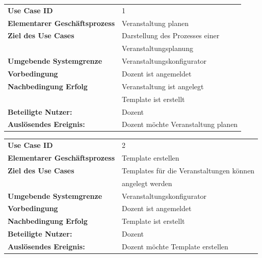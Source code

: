 	\begin{table}[H]
	\begin{tabular}{ll}
	 \textbf{Use Case ID} & 1 \\
 	 \textbf{Elementarer Geschäftsprozess} &  Veranstaltung planen \\ 
	 \textbf{Ziel des Use Cases} & Darstellung des  Prozesses einer    \\
	 & Veranstaltungsplanung\\ 
	 \textbf{Umgebende Systemgrenze}& Veranstaltungskonfigurator \\ 
	 \textbf{Vorbedingung} & Dozent ist angemeldet \\ 
	 \textbf{Nachbedingung Erfolg} & Veranstaltung ist angelegt \\ 
	 & Template ist erstellt\\
	 \textbf{Beteiligte Nutzer:} & Dozent \\ 
     \textbf{Auslösendes Ereignis:} & Dozent möchte Veranstaltung planen \\ 
	 
	\end{tabular} 
	\label{tab:usecase_1}
	\end{table}
	
		\begin{table}[H]
		\begin{tabular}{ll}
		 \textbf{Use Case ID} & 2 \\
	 	 \textbf{Elementarer Geschäftsprozess} &  Template erstellen \\ 
		 \textbf{Ziel des Use Cases} & Templates für die Veranstaltungen können \\& angelegt werden   \\
		 \textbf{Umgebende Systemgrenze}& Veranstaltungskonfigurator \\ 
		 \textbf{Vorbedingung} & Dozent ist angemeldet \\ 
		 \textbf{Nachbedingung Erfolg} & Template ist erstellt \\ 
		 \textbf{Beteiligte Nutzer:} & Dozent \\ 
	     \textbf{Auslösendes Ereignis:} & Dozent möchte Template erstellen \\ 
		 
		\end{tabular} 
		\label{tab:usecase_2}
		\end{table}
	
